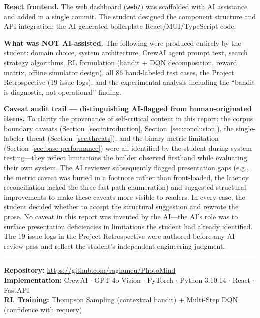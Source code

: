 \documentclass[11pt,letterpaper]{article}
\begin{document}
\textbf{React frontend.} The web dashboard (\texttt{web/}) was scaffolded with AI assistance and added in a single commit. The student designed the component structure and API integration; the AI generated boilerplate React/MUI/TypeScript code.

\textbf{What was NOT AI-assisted.} The following were produced entirely by the student: domain choice, system architecture, CrewAI agent prompt text, search strategy algorithms, RL formulation (bandit + DQN decomposition, reward matrix, offline simulator design), all 86 hand-labeled test cases, the Project Retrospective (19 issue logs), and the experimental analysis including the ``bandit is diagnostic, not operational'' finding.

\textbf{Caveat audit trail --- distinguishing AI-flagged from human-originated items.} To clarify the provenance of self-critical content in this report: the corpus boundary caveats (Section~\ref{sec:introduction}, Section~\ref{sec:conclusion}), the single-labeler threat (Section~\ref{sec:threats}), and the binary metric limitation (Section~\ref{sec:base-performance}) were all identified by the student during system testing---they reflect limitations the builder observed firsthand while evaluating their own system. The AI reviewer subsequently flagged presentation gaps (e.g., the metric caveat was buried in a footnote rather than front-loaded, the latency reconciliation lacked the three-fast-path enumeration) and suggested structural improvements to make these caveats more visible to readers. In every case, the student decided whether to accept the structural suggestion and rewrote the prose. No caveat in this report was invented by the AI---the AI's role was to surface presentation deficiencies in limitations the student had already identified. The 19 issue logs in the Project Retrospective were authored before any AI review pass and reflect the student's independent engineering judgment.

\vspace{2em}
\noindent\rule{\textwidth}{0.4pt}

\noindent
\textbf{Repository:} \url{https://github.com/raghuneu/PhotoMind}\\
\textbf{Implementation:} CrewAI $\cdot$ GPT-4o Vision $\cdot$ PyTorch $\cdot$ Python 3.10.14 $\cdot$ React $\cdot$ FastAPI\\
\textbf{RL Training:} Thompson Sampling (contextual bandit) + Multi-Step DQN (confidence with requery)
\end{document}
